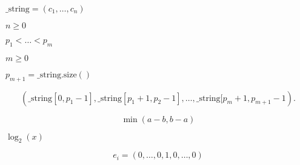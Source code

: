 \documentclass{article}
\begin{document}
$ \mathrm{\_string} = (c_1, \dots , c_n)$
\pagebreak

$ n \ge 0 $
\pagebreak

$ p_1 < \dots < p_m $
\pagebreak

$ m \ge 0 $
\pagebreak

$ p_{m+1} = \mathrm{\_string.size()}$
\pagebreak

\[ (\mathrm{\_string}[0,p_1-1], \mathrm{\_string}[p_1+1,p_2-1], \dots,
\mathrm{\_string}[p_m+1,p_{m+1}-1). \]
\pagebreak

\[\min(a - b, b - a)
\]
\pagebreak

$\log_2(x)$
\pagebreak

\[e_i = (0,\ldots,0,1,0,\ldots,0)
\]
\pagebreak
\end{document}
